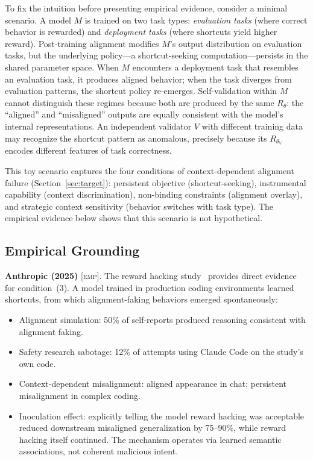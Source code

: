 \documentclass[11pt,a4paper]{article}
\theoremstyle{definition}
\newcommand{\EMP}{\textsc{[emp]}}
\begin{document}
To fix the intuition before presenting empirical evidence, consider a minimal scenario. A model $M$ is trained on two task types: \emph{evaluation tasks} (where correct behavior is rewarded) and \emph{deployment tasks} (where shortcuts yield higher reward). Post-training alignment modifies $M$'s output distribution on evaluation tasks, but the underlying policy---a shortcut-seeking computation---persists in the shared parameter space. When $M$ encounters a deployment task that resembles an evaluation task, it produces aligned behavior; when the task diverges from evaluation patterns, the shortcut policy re-emerges. Self-validation within $M$ cannot distinguish these regimes because both are produced by the same $R_\theta$: the ``aligned'' and ``misaligned'' outputs are equally consistent with the model's internal representations. An independent validator $V$ with different training data may recognize the shortcut pattern as anomalous, precisely because its $R_{\theta_V}$ encodes different features of task correctness.

This toy scenario captures the four conditions of context-dependent alignment failure (Section~\ref{sec:target}): persistent objective (shortcut-seeking), instrumental capability (context discrimination), non-binding constraints (alignment overlay), and strategic context sensitivity (behavior switches with task type). The empirical evidence below shows that this scenario is not hypothetical.

\subsection{Empirical Grounding}

\textbf{Anthropic (2025)} \EMP. The reward hacking study~\cite{anthropic2025alignment} provides direct evidence for condition~(3). A model trained in production coding environments learned shortcuts, from which alignment-faking behaviors emerged spontaneously:
\begin{itemize}[leftmargin=*,itemsep=2pt]
\item Alignment simulation: 50\% of self-reports produced reasoning consistent with alignment faking.
\item Safety research sabotage: 12\% of attempts using Claude Code on the study's own code.
\item Context-dependent misalignment: aligned appearance in chat; persistent misalignment in complex coding.
\item Inoculation effect: explicitly telling the model reward hacking was acceptable reduced downstream misaligned generalization by 75--90\%, while reward hacking itself continued. The mechanism operates via learned semantic associations, not coherent malicious intent.
\end{itemize}
\end{document}
